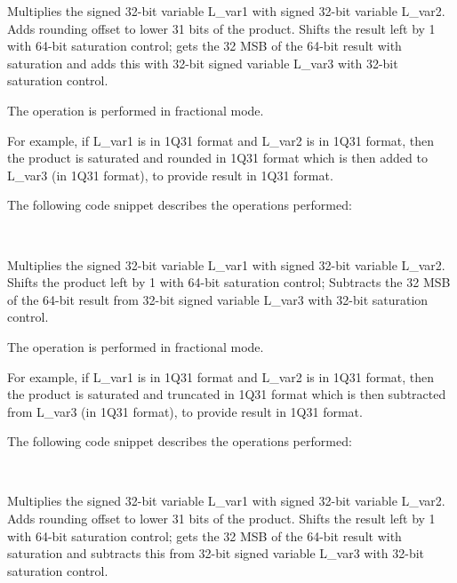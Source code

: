 
Multiplies the signed 32-bit variable L\_var1 with signed 32-bit variable L\_var2.
Adds rounding offset to lower 31 bits of the product.
Shifts the result left by 1 with 64-bit saturation control;
gets the 32 MSB of the 64-bit result with saturation and adds this with 32-bit signed variable L\_var3 with 32-bit saturation control.

The operation is performed in fractional mode.

For example, if L\_var1 is in 1Q31 format and L\_var2 is in 1Q31 format, then the product is saturated and rounded in 1Q31 format which is then added to L\_var3 (in 1Q31 format), to provide result in 1Q31 format.

The following code snippet describes the operations performed:

\\


Multiplies the signed 32-bit variable L\_var1 with signed 32-bit variable L\_var2.
Shifts the product left by 1 with 64-bit saturation control;
Subtracts the 32 MSB of the 64-bit result from 32-bit signed variable L\_var3 with 32-bit saturation control.

The operation is performed in fractional mode.

For example, if L\_var1 is in 1Q31 format and L\_var2 is in 1Q31 format, then the product is saturated and truncated in 1Q31 format which is then subtracted from L\_var3 (in 1Q31 format), to provide result in 1Q31 format.

The following code snippet describes the operations performed:

\\


Multiplies the signed 32-bit variable L\_var1 with signed 32-bit variable L\_var2.
Adds rounding offset to lower 31 bits of the product. Shifts the result left by 1 with 64-bit saturation control;
gets the 32 MSB of the 64-bit result with saturation and subtracts this from 32-bit signed variable L\_var3 with 32-bit saturation control.

